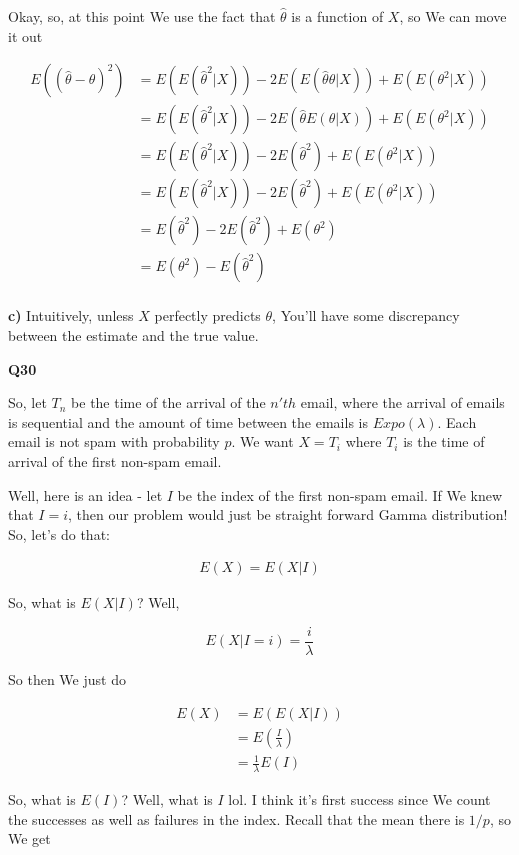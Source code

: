 \documentclass{article}
\begin{document}
			Okay, so, at this point We use the fact that $\hat{\theta}$ is a function of $X$, so We can move it out		
		
			\begin{align*}
			E((\hat{\theta} - \theta)^2) &= E(E(\hat{\theta}^2|X)) -2 E(E(\hat{\theta}\theta |X)) + E(E(\theta^2|X))\\
			&= E(E(\hat{\theta}^2|X)) -2 E(\hat{\theta}E(\theta |X)) + E(E(\theta^2|X))\\
			&= E(E(\hat{\theta}^2|X)) -2 E(\hat{\theta}^2) + E(E(\theta^2|X))\\
			&= E(E(\hat{\theta}^2|X)) -2 E(\hat{\theta}^2) + E(E(\theta^2|X))\\
			&= E(\hat{\theta}^2) -2 E(\hat{\theta}^2) + E(\theta^2)\\
			&= E(\theta^2) - E(\hat{\theta}^2) \\
			\end{align*}
		
			\textbf{c)}
			Intuitively, unless $X$ perfectly predicts $\theta$, You'll have some discrepancy between the estimate and the true value.
		
		\textbf{Q30}
		
			So, let $T_n$ be the time of the arrival of the $n'th$ email, where the arrival of emails is sequential and the amount of time between the emails is $Expo(\lambda)$. Each email is not spam with probability $p$. We want $X=T_i$ where $T_i$ is the time of arrival of the first non-spam email.
			
			Well, here is an idea - let $I$ be the index of the first non-spam email. If We knew that $I=i$, then our problem would just be straight forward Gamma distribution! So, let's do that:
			
			\begin{align*}
			E(X) = E(X|I)
			\end{align*}
		
			So, what is $E(X|I)$? Well, 
			
			\[ E(X|I=i) = \frac{i}{\lambda} \]
			
			So then We just do
			
			\begin{align*}
			E(X) &= E(E(X|I)) \\
			&= E\left(\frac{I}{\lambda}\right) \\
			&= \frac{1}{\lambda} E(I)
			\end{align*}
		
			So, what is $E(I)$? Well, what is $I$ lol. I think it's first success since We count the successes as well as failures in the index. Recall that the mean there is $1/p$, so We get
			
\end{document}
